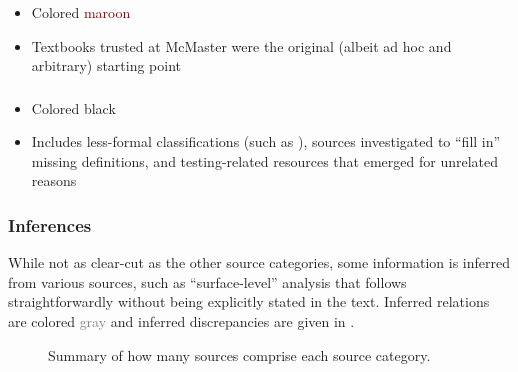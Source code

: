 \subsubsection{}
\label{texts}
\begin{itemize}
    \item Colored \textcolor{Maroon}{maroon}
    \item Textbooks trusted at McMaster \citep{Patton2006, PetersAndPedrycz2000,
              vanVliet2000} were the original (albeit ad hoc and arbitrary) starting
          point
\end{itemize}

\subsubsection{}
\label{others}
\begin{itemize}
    \item Colored black
    \item Includes less-formal classifications (such as
          \citep{KuļešovsEtAl2013}), sources investigated to ``fill in''
          missing definitions, and
          testing-related resources that emerged for unrelated reasons
\end{itemize}

\ifnotpaper
    \subsubsection{Inferences}
    \label{infers}
    While not as clear-cut as the other source categories, some information is
    inferred from various sources, such as ``surface-level'' analysis that
    follows straightforwardly without being explicitly stated in the text.
    Inferred relations are colored \textcolor{gray}{gray} and
    inferred discrepancies are given in .
\fi

\begin{figure}
    \centering
    \caption{Summary of how many sources comprise each source category.}
    \label{fig:sourceSummary}
\end{figure}


